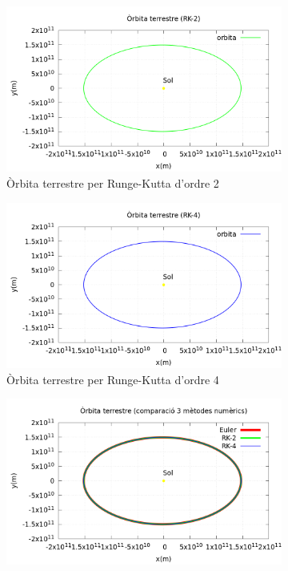 \documentclass[11pt]{article}
\begin{document}
\begin{figure}[hbt!]
    \centering
    \begin{subfigure}{0.5\textwidth}
        \centering
        \includegraphics[width=\textwidth]{orbitaRK2.PNG}
        \caption{Òrbita terrestre per Runge-Kutta d'ordre 2}
        \label{fig: orbitaRK2}
    \end{subfigure}%
    \vspace{0.01\textwidth}%
    \begin{subfigure}{0.5\textwidth}
        \centering
        \includegraphics[width=\textwidth]{orbitaRK4.PNG}
        \caption{Òrbita terrestre per Runge-Kutta d'ordre 4}
        \label{fig: orbitaRK4}
    \end{subfigure}
    \vspace{0.01\textwidth}%
    \begin{subfigure}{0.5\textwidth}
        \centering
        \includegraphics[width=\textwidth]{orbita3met.PNG}

\end{subfigure}
\end{figure}
\end{document}
